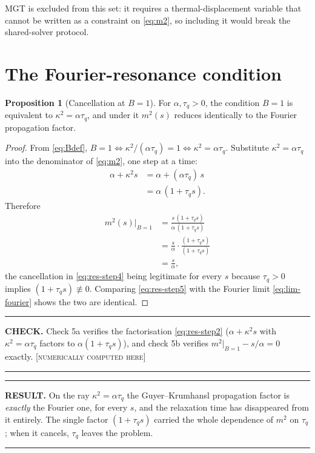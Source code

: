 \documentclass[11pt,a4paper]{article}
\theoremstyle{definition}
\newtheorem{propositionx}{Proposition}[section]
\newenvironment{checkbox}%
  {\par\medskip\noindent\begin{minipage}{\linewidth}%
   \rule{\linewidth}{0.4pt}\par\noindent\textbf{CHECK.}\enspace}%
  {\par\rule{\linewidth}{0.4pt}\end{minipage}\par\medskip}
\newenvironment{resultbox}%
  {\par\medskip\noindent\begin{minipage}{\linewidth}%
   \rule{\linewidth}{1.0pt}\par\noindent\textbf{RESULT.}\enspace}%
  {\par\rule{\linewidth}{1.0pt}\end{minipage}\par\medskip}
\newcommand{\NUM}{\textcolor{red!55!black}{\footnotesize[\textsc{numerically computed here}]}}
\newcommand{\tq}{\tau_{q}}
\newcommand{\kk}{\kappa^{2}}
\newcommand{\Bnum}{B}
\begin{document}
MGT is excluded from this set: it requires a thermal-displacement variable that
cannot be written as a constraint on \eqref{eq:m2}, so including it would break
the shared-solver protocol.

\section{The Fourier-resonance condition}
\label{sec:resonance}

\begin{propositionx}[Cancellation at $\Bnum=1$]
\label{prop:cancel}
For $\alpha,\tq>0$, the condition $\Bnum=1$ is equivalent to
$\kk=\alpha\tq$, and under it $m^{2}(s)$ reduces identically to the Fourier
propagation factor.
\end{propositionx}

\begin{proof}
From \eqref{eq:Bdef}, $\Bnum=1 \iff \kk/(\alpha\tq)=1 \iff \kk=\alpha\tq$.
Substitute $\kk=\alpha\tq$ into the denominator of \eqref{eq:m2}, one step at a
time:
\begin{align}
  \alpha + \kk s
   &= \alpha + (\alpha\tq)\,s
  \label{eq:res-step1}\\
   &= \alpha\,(1 + \tq s) .
  \label{eq:res-step2}
\end{align}
Therefore
\begin{align}
  m^{2}(s)\Big|_{\Bnum=1}
   &= \frac{s\,(1+\tq s)}{\alpha\,(1+\tq s)}
  \label{eq:res-step3}\\
   &= \frac{s}{\alpha}\cdot\frac{(1+\tq s)}{(1+\tq s)}
  \label{eq:res-step4}\\
   &= \frac{s}{\alpha} ,
  \label{eq:res-step5}
\end{align}
the cancellation in \eqref{eq:res-step4} being legitimate for every $s$ because
$\tq>0$ implies $(1+\tq s)\not\equiv0$. Comparing \eqref{eq:res-step5} with the
Fourier limit \eqref{eq:lim-fourier} shows the two are identical.
\end{proof}

\begin{checkbox}
Check 5a verifies the factorisation \eqref{eq:res-step2}
($\alpha+\kk s$ with $\kk=\alpha\tq$ factors to $\alpha(1+\tq s)$), and check
5b verifies $m^{2}|_{\Bnum=1}-s/\alpha=0$ exactly. \NUM
\end{checkbox}

\begin{resultbox}
On the ray $\kk=\alpha\tq$ the Guyer--Krumhansl propagation factor is
\emph{exactly} the Fourier one, for every $s$, and the relaxation time has
disappeared from it entirely. The single factor $(1+\tq s)$ carried the whole
dependence of $m^{2}$ on $\tq$; when it cancels, $\tq$ leaves the problem.
\end{resultbox}
\end{document}
